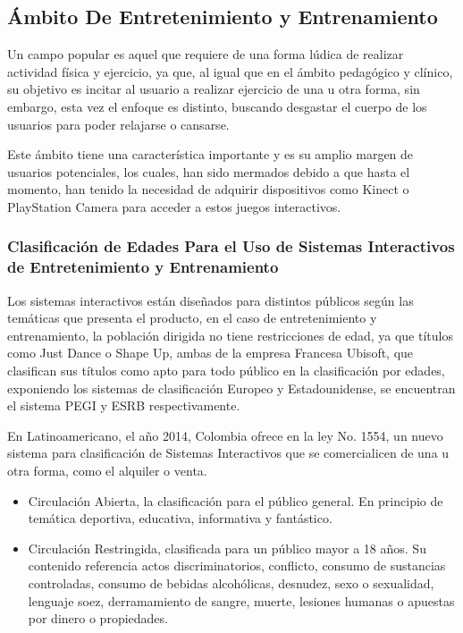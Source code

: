 \subsection{Ámbito De Entretenimiento y Entrenamiento}

Un campo popular es aquel que requiere de una forma lúdica de realizar actividad física y ejercicio, ya que, al igual que en el ámbito pedagógico y clínico, su objetivo es incitar al usuario a realizar ejercicio de una u otra forma, sin embargo, esta vez el enfoque es distinto, buscando desgastar el cuerpo de los usuarios para poder relajarse o cansarse.

Este ámbito tiene una característica importante y es su amplio margen de usuarios potenciales, los cuales, han sido mermados debido a que hasta el momento, han tenido la necesidad de adquirir dispositivos como Kinect o PlayStation Camera para acceder a estos juegos interactivos.

\subsubsection{Clasificación de Edades Para el Uso de Sistemas Interactivos de Entretenimiento y Entrenamiento}

Los sistemas interactivos están diseñados para distintos públicos según las temáticas que presenta el producto, en el caso de entretenimiento y entrenamiento, la población dirigida no tiene restricciones de edad, ya que títulos como Just Dance o Shape Up, ambas de la empresa Francesa Ubisoft, que clasifican sus títulos como apto para todo público en la clasificación por edades, exponiendo los sistemas de clasificación Europeo y Estadounidense, se encuentran el sistema PEGI y ESRB respectivamente.

En Latinoamericano, el año 2014, Colombia ofrece en la ley No. 1554, un nuevo sistema para clasificación de Sistemas Interactivos que se comercialicen de una u otra forma, como el alquiler o venta.
\begin{itemize}
	\item Circulación Abierta, la clasificación para el público general. En principio de temática deportiva, educativa, informativa y fantástico.
	\item Circulación Restringida, clasificada para un público mayor a 18 años. Su contenido referencia actos discriminatorios, conflicto, consumo de sustancias controladas, consumo de bebidas alcohólicas, desnudez, sexo o sexualidad, lenguaje soez, derramamiento de sangre, muerte, lesiones humanas o apuestas por dinero o propiedades.
\end{itemize}

